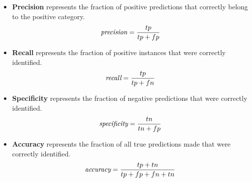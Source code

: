 \begin{itemize}
  \item \textbf{Precision} represents the fraction of positive predictions that correctly belong to the positive category.
  \begin{equation}
    \emph{$\text{precision} = \frac{tp}{tp + fp}$}
    \label{equ:precision}
  \end{equation}

  \item \textbf{Recall} represents the fraction of positive instances that were correctly identified.
  \begin{equation}
    \emph{$\text{recall} = \frac{tp}{tp + fn}$}
    \label{equ:recall}
  \end{equation}

  \item \textbf{Specificity} represents the fraction of negative predictions that were correctly identified.
  \begin{equation}
    \emph{$\text{specificity} = \frac{tn}{tn + fp}$}
    \label{equ:specificity}
  \end{equation}

  \item \textbf{Accuracy} represents the fraction of all true predictions made that were correctly identified.
  \begin{equation}
    \emph{$\text{accuracy} = \frac{tp + tn}{tp + fp + fn + tn}$}
    \label{equ:accuracy}
  \end{equation}
\end{itemize}


